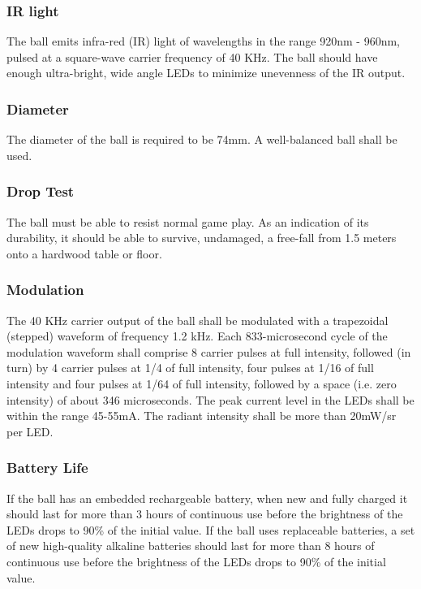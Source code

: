 \documentclass{article}
\begin{document}
\subsubsection{IR light}

The ball emits infra-red (IR) light of wavelengths in the range 920nm - 960nm,
pulsed at a square-wave carrier frequency of 40 KHz. The ball should have
enough ultra-bright, wide angle LEDs to minimize unevenness of the IR output.

\subsubsection{Diameter}

The diameter of the ball is required to be 74mm. A well-balanced ball shall be
used.

\subsubsection{Drop Test}

The ball must be able to resist normal game play. As an indication of its
durability, it should be able to survive, undamaged, a free-fall from 1.5
meters onto a hardwood table or floor.

\subsubsection{Modulation}

The 40 KHz carrier output of the ball shall be modulated with a trapezoidal
(stepped) waveform of frequency 1.2 kHz. Each 833-microsecond cycle of the
modulation waveform shall comprise 8 carrier pulses at full intensity, followed
(in turn) by 4 carrier pulses at 1/4 of full intensity, four pulses at 1/16 of
full intensity and four pulses at 1/64 of full intensity, followed by a space
(i.e. zero intensity) of about 346 microseconds. The peak current level in the
LEDs shall be within the range 45-55mA. The radiant intensity shall be more
than 20mW/sr per LED.

\subsubsection{Battery Life}

If the ball has an embedded rechargeable battery, when new and fully charged it
should last for more than 3 hours of continuous use before the brightness of
the LEDs drops to 90\% of the initial value. If the ball uses replaceable
batteries, a set of new high-quality alkaline batteries should last for more
than 8 hours of continuous use before the brightness of the LEDs drops to 90\%
of the initial value.
\end{document}
